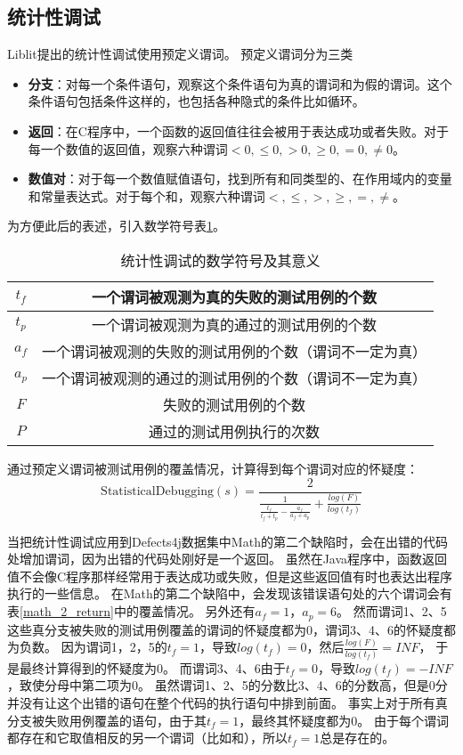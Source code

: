 \subsection{统计性调试}

Liblit\parencite{Liblit2005Scalable}提出的统计性调试使用预定义谓词。
预定义谓词分为三类
\begin{itemize}
\item \textbf{分支}：对每一个条件语句，观察这个条件语句为真的谓词和为假的谓词。这个条件语句包括条件这样的，也包括各种隐式的条件比如循环。
\item \textbf{返回}：在C程序中，一个函数的返回值往往会被用于表达成功或者失败。对于每一个数值的返回值，观察六种谓词$< 0, \le 0, > 0, \ge 0, = 0, \ne 0$。
\item \textbf{数值对}：对于每一个数值赋值语句，找到所有和同类型的、在作用域内的变量和常量表达式。对于每个和，观察六种谓词$<, \le, >, \ge, =, \ne$。
\end{itemize}
为方便此后的表述，引入数学符号表\ref{state_symbol}。
\begin{table}
\centering
\begin{tabular}{|c|c|}
\hline
$t_f$ & 一个谓词被观测为真的失败的测试用例的个数 \\
\hline
$t_p$ & 一个谓词被观测为真的通过的测试用例的个数 \\
\hline
$a_f$ & 一个谓词被观测的失败的测试用例的个数（谓词不一定为真）\\
\hline
$a_p$ & 一个谓词被观测的通过的测试用例的个数（谓词不一定为真）\\
\hline
$F$ & 失败的测试用例的个数 \\
\hline
$P$ & 通过的测试用例执行的次数 \\
\hline
\end{tabular}
\caption{统计性调试的数学符号及其意义}
\label{state_symbol}
\end{table}

通过预定义谓词被测试用例的覆盖情况，计算得到每个谓词对应的怀疑度：
$$
\mathrm{StatisticalDebugging}(s) = \frac{2}{\frac{1}{\frac{t_f}{t_f + t_p} - \frac{a_f}{a_f + a_p}} + \frac{log(F)}{log(t_f)}}\label{eq:sd}
$$

当把统计性调试应用到Defects4j数据集中Math的第二个缺陷时，会在出错的代码处增加谓词，因为出错的代码处刚好是一个返回。
虽然在Java程序中，函数返回值不会像C程序那样经常用于表达成功或失败，但是这些返回值有时也表达出程序执行的一些信息。
在Math的第二个缺陷中，会发现该错误语句处的六个谓词会有表\ref{math_2_return}中的覆盖情况。
另外还有$a_f = 1$，$a_p = 6$。
然而谓词1、2、5这些真分支被失败的测试用例覆盖的谓词的怀疑度都为0，谓词3、4、6的怀疑度都为负数。
因为谓词1，2，5的$t_f = 1$，导致$log(t_f) = 0$，然后$\frac{log(F)}{log(t_f)} = INF$，
于是最终计算得到的怀疑度为0。
而谓词3、4、6由于$t_f = 0$，导致$log(t_f) = -INF$，致使分母中第二项为0。
虽然谓词1、2、5的分数比3、4、6的分数高，但是0分并没有让这个出错的语句在整个代码的执行语句中排到前面。
事实上对于所有真分支被失败用例覆盖的语句，由于其$t_f = 1$，最终其怀疑度都为0。
由于每个谓词都存在和它取值相反的另一个谓词（比如和），所以$t_f = 1$总是存在的。


